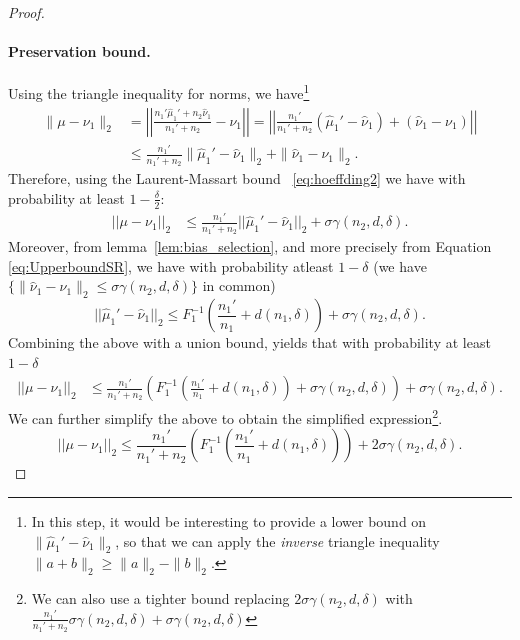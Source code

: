\begin{proof}
\paragraph{Preservation bound.}
Using the triangle inequality for norms, we have\footnote{In this step, it would be interesting to provide a lower bound on $\|\hat{\mu}_1' - \hat{\nu}_1\|_2$, so that we can apply the \textit{inverse} triangle inequality $ \|a+b\|_2 \geq \|a\|_2 -\|b\|_2$.}
\begin{align*}
    \|\mu - \nu_1\|_2
    &= \left|\left|\frac{n_1' \hat{\mu}_1' + n_2 \hat{\nu}_1}{n_1' + n_2} - \nu_1 \right|\right| = \left|\left|\frac{n_1'}{n_1' + n_2} (\hat{\mu}_1' - \hat{\nu}_1) +  (\hat{\nu}_1 - \nu_1) \right|\right|\\
    &\leq 
    \frac{n_1'}{n_1' + n_2} \|\hat{\mu}_1' - \hat{\nu}_1\|_2 + \|\hat{\nu}_1 - \nu_1\|_2.
\end{align*}
Therefore, using the Laurent-Massart bound ~\eqref{eq:hoeffding2} we have with probability at least  $1-\tfrac{\delta}{2}$:
\begin{align*}
    ||\mu - \nu_1||_2
    &\leq \frac{n_1'}{n_1' + n_2} ||\hat{\mu}_1' - \hat{\nu}_1||_2+ \sigma \gamma(n_2,d,\delta).
\end{align*}
Moreover, from lemma~\ref{lem:bias_selection}, and more precisely from Equation \ref{eq:UpperboundSR}, we have with probability atleast $1-\delta$ (we have $\{\|\hat{\nu}_1- \nu_1\|_2 \leq \sigma \gamma(n_2, d,\delta)\}$ in common)
\begin{equation*}
    ||\hat{\mu}_1' - \hat{\nu}_1||_2 \leq F_1^{-1}\left(\frac{n_1'}{n_1} +d(n_1, \delta)\right) +  \sigma \gamma(n_2,d,\delta).
\end{equation*}
Combining the above with a union bound, yields that with probability at least $1-\delta$
\begin{align*}
    ||\mu - \nu_1||_2
    &\leq \frac{n_1'}{n_1' + n_2} 
    \left(F_1^{-1}\left(\frac{n_1'}{n_1} +d(n_1, \delta)\right) + \sigma \gamma(n_2,d,\delta)\right)
    + 
   \sigma  \gamma(n_2,d,\delta).
\end{align*}
We can further simplify the above to obtain the simplified expression\footnote{We can also use a tighter bound replacing $2\sigma \gamma(n_2,d,\delta)$ with $\frac{n_1'}{n_1'+n_2} \sigma \gamma(n_2,d,\delta) + \sigma \gamma(n_2,d,\delta) $}.
\begin{equation} \label{eq:tighterbound}
    ||\mu - \nu_1||_2
    \leq \frac{n_1'}{n_1' + n_2} 
    \left(F_1^{-1}\left(\frac{n_1'}{n_1} +d(n_1, \delta)\right)\right)
    + 
    2 \sigma \gamma(n_2,d,\delta).
\end{equation}




\end{proof}
